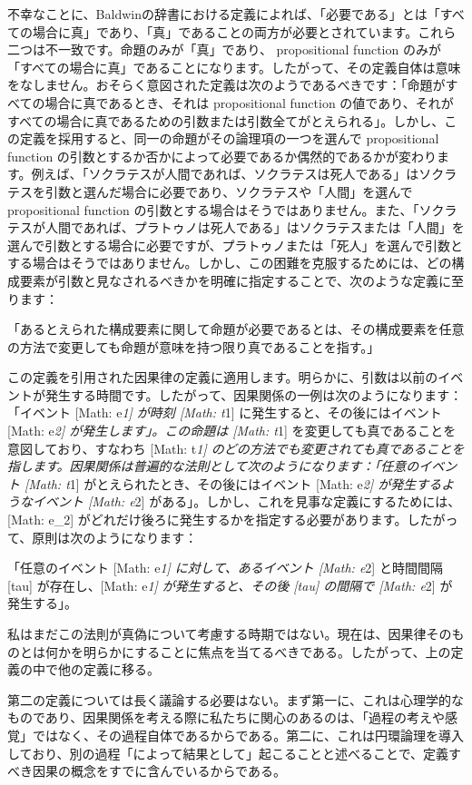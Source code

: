 \documentclass[a4paper,11pt,openany]{ltjsbook}
\begin{document}
不幸なことに、Baldwinの辞書における定義によれば、「必要である」とは「すべての場合に真」であり、「真」であることの両方が必要とされています。これら二つは不一致です。命題のみが「真」であり、 propositional function のみが「すべての場合に真」であることになります。したがって、その定義自体は意味をなしません。おそらく意図された定義は次のようであるべきです：「命題がすべての場合に真であるとき、それは propositional function の値であり、それがすべての場合に真であるための引数または引数全てがとえられる」。しかし、この定義を採用すると、同一の命題がその論理項の一つを選んで propositional function の引数とするか否かによって必要であるか偶然的であるかが変わります。例えば、「ソクラテスが人間であれば、ソクラテスは死人である」はソクラテスを引数と選んだ場合に必要であり、ソクラテスや「人間」を選んで propositional function の引数とする場合はそうではありません。また、「ソクラテスが人間であれば、プラトゥノは死人である」はソクラテスまたは「人間」を選んで引数とする場合に必要ですが、プラトゥノまたは「死人」を選んで引数とする場合はそうではありません。しかし、この困難を克服するためには、どの構成要素が引数と見なされるべきかを明確に指定することで、次のような定義に至ります：

「あるとえられた構成要素に関して命題が必要であるとは、その構成要素を任意の方法で変更しても命題が意味を持つ限り真であることを指す。」

この定義を引用された因果律の定義に適用します。明らかに、引数は以前のイベントが発生する時間です。したがって、因果関係の一例は次のようになります：「イベント [Math: e\textit{{1}] が時刻 [Math: t}{1}] に発生すると、その後にはイベント [Math: e\textit{{2}] が発生します」。この命題は [Math: t}{1}] を変更しても真であることを意図しており、すなわち [Math: t\textit{{1}] のどの方法でも変更されても真であることを指します。因果関係は普遍的な法則として次のようになります：「任意のイベント [Math: t}{1}] がとえられたとき、その後にはイベント [Math: e\textit{{2}] が発生するようなイベント [Math: e}{2}] がある」。しかし、これを見事な定義にするためには、[Math: e\_{2}] がどれだけ後ろに発生するかを指定する必要があります。したがって、原則は次のようになります：

「任意のイベント [Math: e\textit{{1}] に対して、あるイベント [Math: e}{2}] と時間間隔 [tau] が存在し、[Math: e\textit{{1}] が発生すると、その後 [tau] の間隔で [Math: e}{2}] が発生する」。

私はまだこの法則が真偽について考慮する時期ではない。現在は、因果律そのものとは何かを明らかにすることに焦点を当てるべきである。したがって、上の定義の中で他の定義に移る。

第二の定義については長く議論する必要はない。まず第一に、これは心理学的なものであり、因果関係を考える際に私たちに関心のあるのは、「過程の考えや感覚」ではなく、その過程自体であるからである。第二に、これは円環論理を導入しており、別の過程「によって結果として」起こることと述べることで、定義すべき因果の概念をすでに含んでいるからである。
\end{document}
